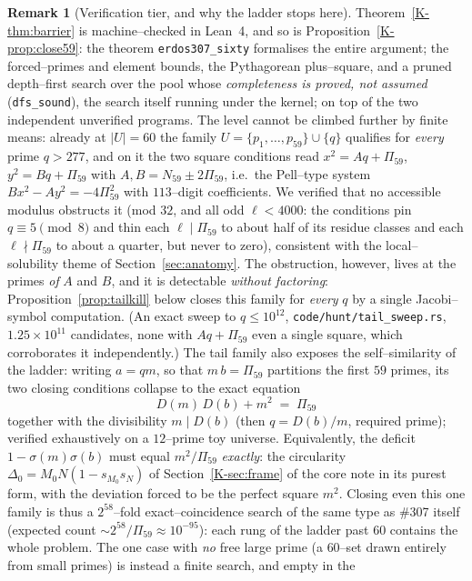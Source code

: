 \documentclass[11pt]{article}
\theoremstyle{definition}
\newtheorem{remark}[theorem]{Remark}
\begin{document}
\begin{remark}[Verification tier, and why the ladder stops here]\label{rem:tier60}
Theorem~\ref{K-thm:barrier} is machine--checked in Lean~4, and so is
Proposition~\ref{K-prop:close59}: the theorem \texttt{erdos307\_sixty} formalises the entire
argument; the forced--primes and element bounds, the Pythagorean plus--square, and a pruned
depth--first search over the pool whose \emph{completeness is proved, not assumed}
(\texttt{dfs\_sound}), the search itself running under the kernel; on top of the
two independent unverified programs. The level cannot be climbed further by finite means: already at $|U|=60$ the family
$U=\{p_1,\dots,p_{59}\}\cup\{q\}$ qualifies for \emph{every} prime $q>277$, and on it the two square
conditions read $x^2=Aq+\Pi_{59}$, $y^2=Bq+\Pi_{59}$ with $A,B=N_{59}\pm2\Pi_{59}$, i.e.\ the
Pell--type system $Bx^2-Ay^2=-4\Pi_{59}^2$ with $113$--digit coefficients. We verified that no
accessible modulus obstructs it (mod $32$, and all odd $\ell<4000$: the conditions pin
$q\equiv5\pmod 8$ and thin each $\ell\mid\Pi_{59}$ to about half of its residue classes and each
$\ell\nmid\Pi_{59}$ to about a quarter, but never to zero), consistent with the local--solubility
theme of Section~\ref{sec:anatomy}. The obstruction, however, lives at the primes \emph{of} $A$
and $B$, and it is detectable \emph{without factoring}: Proposition~\ref{prop:tailkill} below
closes this family for \emph{every} $q$ by a single Jacobi--symbol computation. (An exact sweep to
$q\le10^{12}$, \texttt{code/hunt/tail\_sweep.rs}, $1.25\times10^{11}$ candidates, none with
$Aq+\Pi_{59}$ even a single square, which corroborates it independently.) The tail family also exposes the self--similarity of the ladder:
writing $a=qm$, so that $m\,b=\Pi_{59}$ partitions the first $59$ primes, its two closing
conditions collapse to the exact equation
\[ D(m)\,D(b)+m^2\;=\;\Pi_{59} \]
together with the divisibility $m\mid D(b)$ (then $q=D(b)/m$, required prime); verified
exhaustively on a $12$--prime toy universe. Equivalently, the deficit $1-\sigma(m)\sigma(b)$ must
equal $m^2/\Pi_{59}$ \emph{exactly}: the circularity $\Delta_0=M_0N(1-s_{M_0}s_N)$ of
Section~\ref{K-sec:frame} of the core note in its purest form, with the deviation forced to be the perfect square
$m^2$. Closing even this one family is thus a $2^{58}$--fold exact--coincidence search of the same
type as \#307 itself (expected count ${\sim}2^{58}/\Pi_{59}\approx10^{-95}$): each rung of the
ladder past $60$ contains the whole problem. The one case with \emph{no} free large prime (a
$60$--set drawn entirely from small primes) is instead a finite search, and empty in the

\end{remark}
\end{document}
